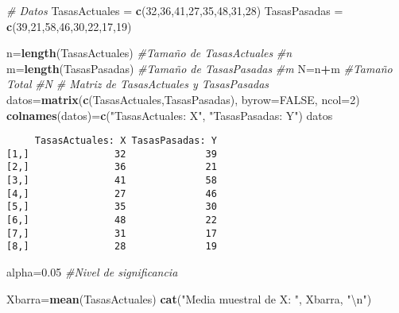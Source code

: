 \documentclass[a4paper,oneside,openany]{book}
\newenvironment{Shaded}{\begin{snugshade}}{\end{snugshade}}
\newcommand{\KeywordTok}[1]{\textcolor[rgb]{0.13,0.29,0.53}{\textbf{#1}}}
\newcommand{\DataTypeTok}[1]{\textcolor[rgb]{0.13,0.29,0.53}{#1}}
\newcommand{\DecValTok}[1]{\textcolor[rgb]{0.00,0.00,0.81}{#1}}
\newcommand{\FloatTok}[1]{\textcolor[rgb]{0.00,0.00,0.81}{#1}}
\newcommand{\CharTok}[1]{\textcolor[rgb]{0.31,0.60,0.02}{#1}}
\newcommand{\StringTok}[1]{\textcolor[rgb]{0.31,0.60,0.02}{#1}}
\newcommand{\CommentTok}[1]{\textcolor[rgb]{0.56,0.35,0.01}{\textit{#1}}}
\newcommand{\OtherTok}[1]{\textcolor[rgb]{0.56,0.35,0.01}{#1}}
\newcommand{\OperatorTok}[1]{\textcolor[rgb]{0.81,0.36,0.00}{\textbf{#1}}}
\newcommand{\NormalTok}[1]{#1}
\begin{document}
\begin{Shaded}
\begin{Highlighting}[]
\CommentTok{# Datos}
\NormalTok{TasasActuales =}\StringTok{ }\KeywordTok{c}\NormalTok{(}\DecValTok{32}\NormalTok{,}\DecValTok{36}\NormalTok{,}\DecValTok{41}\NormalTok{,}\DecValTok{27}\NormalTok{,}\DecValTok{35}\NormalTok{,}\DecValTok{48}\NormalTok{,}\DecValTok{31}\NormalTok{,}\DecValTok{28}\NormalTok{)}
\NormalTok{TasasPasadas =}\StringTok{ }\KeywordTok{c}\NormalTok{(}\DecValTok{39}\NormalTok{,}\DecValTok{21}\NormalTok{,}\DecValTok{58}\NormalTok{,}\DecValTok{46}\NormalTok{,}\DecValTok{30}\NormalTok{,}\DecValTok{22}\NormalTok{,}\DecValTok{17}\NormalTok{,}\DecValTok{19}\NormalTok{)}

\NormalTok{n=}\KeywordTok{length}\NormalTok{(TasasActuales)  }\CommentTok{#Tamaño de TasasActuales}
\CommentTok{#n}
\NormalTok{m=}\KeywordTok{length}\NormalTok{(TasasPasadas)   }\CommentTok{#Tamaño de TasasPasadas}
\CommentTok{#m}
\NormalTok{N=n}\OperatorTok{+}\NormalTok{m                    }\CommentTok{#Tamaño Total}
\CommentTok{#N}
\CommentTok{# Matriz de TasasActuales y TasasPasadas}
\NormalTok{datos=}\KeywordTok{matrix}\NormalTok{(}\KeywordTok{c}\NormalTok{(TasasActuales,TasasPasadas), }\DataTypeTok{byrow=}\OtherTok{FALSE}\NormalTok{, }\DataTypeTok{ncol=}\DecValTok{2}\NormalTok{)}
\KeywordTok{colnames}\NormalTok{(datos)=}\KeywordTok{c}\NormalTok{(}\StringTok{"TasasActuales: X"}\NormalTok{, }\StringTok{"TasasPasadas: Y"}\NormalTok{)}
\NormalTok{datos}
\end{Highlighting}
\end{Shaded}

\begin{verbatim}
     TasasActuales: X TasasPasadas: Y
[1,]               32              39
[2,]               36              21
[3,]               41              58
[4,]               27              46
[5,]               35              30
[6,]               48              22
[7,]               31              17
[8,]               28              19
\end{verbatim}

\begin{Shaded}
\begin{Highlighting}[]
\NormalTok{alpha=}\FloatTok{0.05}  \CommentTok{#Nivel de significancia }

\NormalTok{Xbarra=}\KeywordTok{mean}\NormalTok{(TasasActuales)}
\KeywordTok{cat}\NormalTok{(}\StringTok{"Media muestral de X: "}\NormalTok{, Xbarra, }\StringTok{"}\CharTok{\textbackslash{}n}\StringTok{"}\NormalTok{)}
\end{Highlighting}
\end{Shaded}
\end{document}
